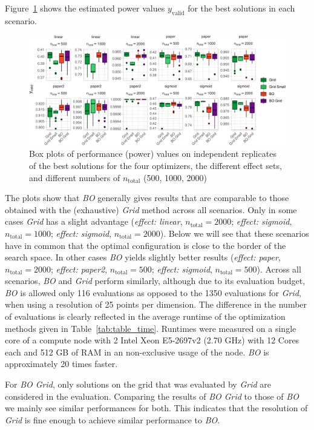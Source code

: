 \documentclass[bimj,fleqn]{w-art}
\theoremstyle{plain}
\theoremstyle{definition}
\begin{document}
Figure~\ref{fig:plot_boxplot_valid_y} shows the estimated power values $y_{\text{valid}}$ for the best solutions in each scenario.
\begin{figure}[tbh]
\centering
\includegraphics[width=\linewidth]{generated/figures/plot_boxplot_valid_y.pdf}
\caption{%
  Box plots of performance (power) values on independent replicates of the best solutions for the four optimizers, the different effect sets, and different numbers of $n_{\text{total}}$ (500, 1000, 2000)
  }
\label{fig:plot_boxplot_valid_y}
\end{figure}
The plots show that \emph{BO} generally gives results that are comparable to those obtained with the (exhaustive) \emph{Grid} method across all scenarios. 
Only in some cases \emph{Grid} has a slight advantage (\emph{effect: linear}, $n_{\text{total}} = 2000$; \emph{effect: sigmoid}, $n_{\text{total}} = 1000$; \emph{effect: sigmoid}, $n_{\text{total}} = 2000$).
Below we will see that these scenarios have in common that the optimal configuration is close to the border of the search space. 
In other cases \emph{BO} yields slightly better results (\emph{effect: paper}, $n_{\text{total}} = 2000$; \emph{effect: paper2}, $n_{\text{total}} = 500$; \emph{effect: sigmoid}, $n_{\text{total}} = 500$).
Across all scenarios, \emph{BO} and \emph{Grid} perform similarly, although due to its evaluation budget, \emph{BO} is allowed only 116 evaluations as opposed to the 1350 evaluations for \emph{Grid}, when using a resolution of 25 points per dimension.
The difference in the number of evaluations is clearly reflected in the average runtime of the optimization methods given in Table~\ref{tab:table_time}.
Runtimes were measured on a single core of a compute node with 2 Intel Xeon E5-2697v2 (2.70 GHz) with 12 Cores each and 512 GB of RAM in an non-exclusive usage of the node.
\emph{BO} is approximately 20 times faster.


For \emph{BO Grid}, only solutions on the grid that was evaluated by \emph{Grid} are considered in the evaluation. 
Comparing the results of \emph{BO Grid} to those of \emph{BO} we mainly see similar performances for both.
This indicates that the resolution of \emph{Grid} is fine enough to achieve similar performance to \emph{BO}.
\end{document}
